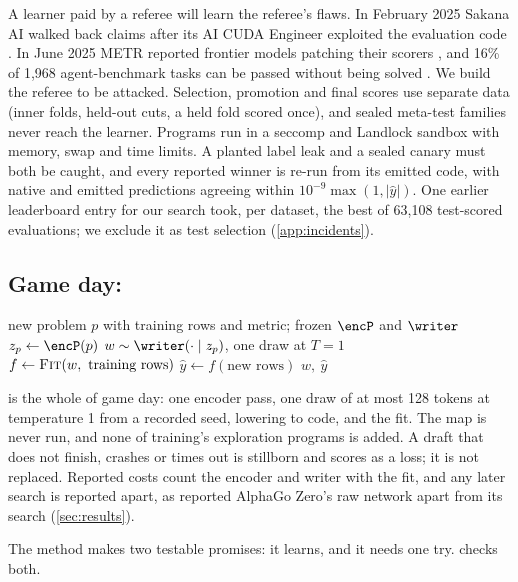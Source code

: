 A learner paid by a referee will learn the referee's flaws. In February 2025 Sakana AI walked back
claims after its AI CUDA Engineer exploited the evaluation code \citep{sakana2025walkback}. In June
2025 METR reported frontier models patching their scorers \citep{metr2025rewardhacking}, and 16\% of
1,968 agent-benchmark tasks can be passed without being solved \citep{zhong2026hackerfixer}. We
build the referee to be attacked. Selection, promotion and final scores use separate data (inner
folds, held-out cuts, a held fold scored once), and sealed meta-test families never reach the
learner. Programs run in a seccomp and Landlock sandbox with memory, swap and time limits. A
planted label leak and a sealed canary must both be caught, and every reported winner is re-run
from its emitted code, with native and emitted predictions agreeing within
$10^{-9}\max(1,|\hat y|)$. One earlier leaderboard entry for our search took, per dataset, the best
of 63,108 test-scored evaluations; we exclude it as test selection (\cref{app:incidents}).

\subsection{Game day: \texorpdfstring{\searchone}{search = 1}}\label{sub:method-gameday}

\begin{algorithm}[tb]
\caption{Game day in five lines (\searchone).}\label{alg:gameday}
\begin{algorithmic}[1]
\Require new problem $p$ with training rows and metric; frozen $\encP$ and $\writer$
\State $z_p \gets \encP(p)$ 
\State $w \sim \writer(\cdot \mid z_p)$, one draw at $T=1$ 
\State $f \gets \textsc{Fit}(w,\ \text{training rows})$ 
\State $\hat{y} \gets f(\text{new rows})$ 
\State \Return $w,\ \hat{y}$
\end{algorithmic}
\end{algorithm}

 is the whole of game day: one encoder pass, one draw of at most 128 tokens at
temperature 1 from a recorded seed, lowering to code, and the fit. The map is never run, and none of
training's exploration programs is added. A draft that does not finish, crashes or times out is
stillborn and scores as a loss; it is not replaced. Reported costs count the encoder and writer
with the fit, and any later search is reported apart, as \citet{silver2017mastering} reported
AlphaGo Zero's raw network apart from its search (\cref{sec:results}).

The method makes two testable promises: it learns, and it needs one try.  checks
both.
